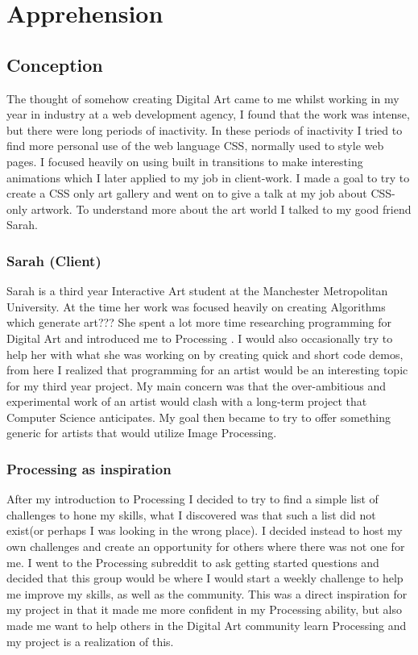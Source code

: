 \documentclass[a4paper]{report}
\begin{document}
\chapter{Apprehension}
\section{Conception}
The thought of somehow creating Digital Art came to me whilst working in my year in industry at a web development agency, I found that the work was intense, but there were long periods of inactivity. In these periods of inactivity I tried to find more personal use of the web language CSS, normally used to style web pages. I focused heavily on using built in transitions to make interesting animations which I later applied to my job in client-work. I made a goal to try to create a CSS only art gallery and went on to give a talk at my job about CSS-only artwork. To understand more about the art world I talked to my good friend Sarah.

\subsection{Sarah (Client)}
Sarah is a third year Interactive Art student at the Manchester Metropolitan University. At the time her work was focused heavily on creating Algorithms which generate art??? She spent a lot more time researching programming for Digital Art and introduced me to Processing \cite{PROCESSING}. I would also occasionally try to help her with what she was working on by creating quick and short code demos, from here I realized that programming for an artist would be an interesting topic for my third year project. My main concern was that the over-ambitious and experimental work of an artist would clash with a long-term project that Computer Science anticipates. My goal then became to try to offer something generic for artists that would utilize Image Processing. 

\subsection{Processing as inspiration}
After my introduction to Processing I decided to try to find a simple list of challenges to hone my skills, what I discovered was that such a list did not exist(or perhaps I was looking in the wrong place). I decided instead to host my own challenges and create an opportunity for others where there was not one for me. I went to the Processing subreddit\cite{RPROCESSING} to ask getting started questions and decided that this group would be where I would start a weekly challenge to help me improve my skills, as well as the community. This was a direct inspiration for my project in that it made me more confident in my Processing ability, but also made me want to help others in the Digital Art community learn Processing and my project is a realization of this.
\end{document}
